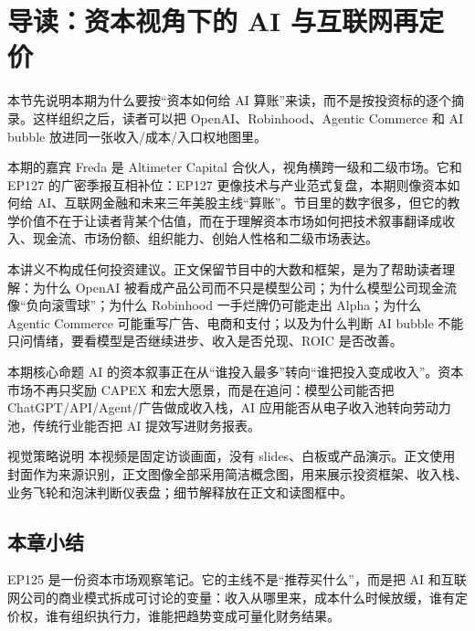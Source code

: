 \section{导读：资本视角下的 AI 与互联网再定价}

本节先说明本期为什么要按“资本如何给 AI 算账”来读，而不是按投资标的逐个摘录。这样组织之后，读者可以把 OpenAI、Robinhood、Agentic Commerce 和 AI bubble 放进同一张收入/成本/入口权地图里。

本期的嘉宾 Freda 是 Altimeter Capital 合伙人，视角横跨一级和二级市场。它和 EP127 的广密季报互相补位：EP127 更像技术与产业范式复盘，本期则像资本如何给 AI、互联网金融和未来三年美股主线“算账”。节目里的数字很多，但它的教学价值不在于让读者背某个估值，而在于理解资本市场如何把技术叙事翻译成收入、现金流、市场份额、组织能力、创始人性格和二级市场表达。

本讲义不构成任何投资建议。正文保留节目中的大数和框架，是为了帮助读者理解：为什么 OpenAI 被看成产品公司而不只是模型公司；为什么模型公司现金流像“负向滚雪球”；为什么 Robinhood 一手烂牌仍可能走出 Alpha；为什么 Agentic Commerce 可能重写广告、电商和支付；以及为什么判断 AI bubble 不能只问情绪，要看模型是否继续进步、收入是否兑现、ROIC 是否改善。

\begin{importantbox}{本期核心命题}
AI 的资本叙事正在从“谁投入最多”转向“谁把投入变成收入”。资本市场不再只奖励 CAPEX 和宏大愿景，而是在追问：模型公司能否把 ChatGPT/API/Agent/广告做成收入栈，AI 应用能否从电子收入池转向劳动力池，传统行业能否把 AI 提效写进财务报表。
\end{importantbox}

\begin{knowledgebox}{视觉策略说明}
本视频是固定访谈画面，没有 slides、白板或产品演示。正文使用封面作为来源识别，正文图像全部采用简洁概念图，用来展示投资框架、收入栈、业务飞轮和泡沫判断仪表盘；细节解释放在正文和读图框中。
\end{knowledgebox}

\subsection{本章小结}

EP125 是一份资本市场观察笔记。它的主线不是“推荐买什么”，而是把 AI 和互联网公司的商业模式拆成可讨论的变量：收入从哪里来，成本什么时候放缓，谁有定价权，谁有组织执行力，谁能把趋势变成可量化财务结果。

